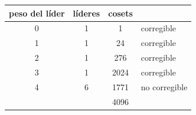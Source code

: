 \begin{tabular}{@{}cccl@{}}
\toprule
peso del líder & líderes & cosets & \\
\midrule
0 & 1 & 1 & corregible \\
1 & 1 & 24 & corregible \\
2 & 1 & 276 & corregible \\
3 & 1 & 2024 & corregible \\
4 & 6 & 1771 & no corregible \\
\midrule
& & 4096 & \\
\bottomrule
\end{tabular}
